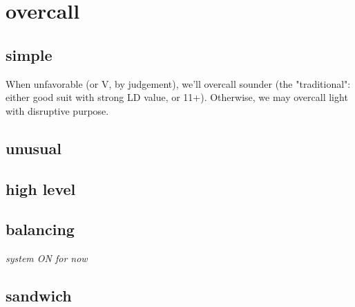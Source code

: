 \section{overcall}

\subsection{simple}

When unfavorable (or V, by judgement), we'll overcall sounder (the "traditional": either good suit with strong LD value, or 11+).
Otherwise, we may overcall light with disruptive purpose.


\subsection{unusual}


\subsection{high level}


\subsection{balancing}

\textit{system ON for now}

\subsection{sandwich}

